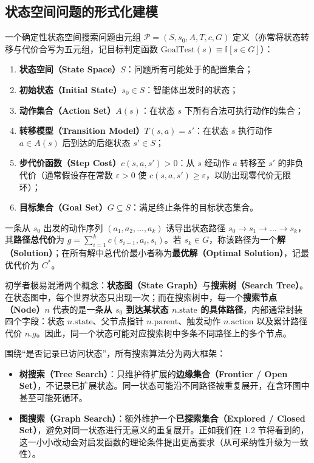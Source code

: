 \subsection{状态空间问题的形式化建模}

\begin{defBox}
\begin{definition}[确定性单智能体状态空间搜索问题]\label{def:search-problem}
一个确定性状态空间搜索问题由元组 $\mathcal{P} = (S, s_0, A, T, c, G)$ 定义（亦常将状态转移与代价合写为五元组，记目标判定函数 $\text{GoalTest}(s) \equiv \mathbb{I}[s \in G]$）：
\begin{enumerate}
  \item \textbf{状态空间（State Space）}$S$：问题所有可能处于的配置集合；
  \item \textbf{初始状态（Initial State）}$s_0 \in S$：智能体出发时的状态；
  \item \textbf{动作集合（Action Set）}$A(s)$：在状态 $s$ 下所有合法可执行动作的集合；
  \item \textbf{转移模型（Transition Model）}$T(s, a) = s'$：在状态 $s$ 执行动作 $a \in A(s)$ 后到达的后继状态 $s' \in S$；
  \item \textbf{步代价函数（Step Cost）}$c(s, a, s') > 0$：从 $s$ 经动作 $a$ 转移至 $s'$ 的非负代价（通常假设存在常数 $\varepsilon > 0$ 使 $c(s,a,s')\ge \varepsilon$，以防出现零代价无限环）；
  \item \textbf{目标集合（Goal Set）}$G \subseteq S$：满足终止条件的目标状态集合。
\end{enumerate}
一条从 $s_0$ 出发的动作序列 $(a_1, a_2, \dots, a_k)$ 诱导出状态路径 $s_0 \to s_1 \to \dots \to s_k$，其\textbf{路径总代价}为 $g = \sum_{i=1}^{k} c(s_{i-1}, a_i, s_i)$。若 $s_k \in G$，称该路径为一个\textbf{解（Solution）}；在所有解中总代价最小者称为\textbf{最优解（Optimal Solution）}，记最优代价为 $C^*$。
\end{definition}
\end{defBox}

初学者极易混淆两个概念：\textbf{状态图（State Graph）}与\textbf{搜索树（Search Tree）}。在状态图中，每个世界状态只出现一次；而在搜索树中，每一个\textbf{搜索节点（Node）}$n$ 代表的是一条\textbf{从 $s_0$ 到达某状态 $n.\text{state}$ 的具体路径}，内部通常封装四个字段：状态 $n.\text{state}$、父节点指针 $n.\text{parent}$、触发动作 $n.\text{action}$ 以及累计路径代价 $n.g$。因此，同一个状态可能对应搜索树中多条不同路径上的多个节点。

围绕“是否记录已访问状态”，所有搜索算法分为两大框架：
\begin{itemize}
  \item \textbf{树搜索（Tree Search）}：只维护待扩展的\textbf{边缘集合（Frontier / Open Set）}，不记录已扩展状态。同一状态可能沿不同路径被重复展开，在含环图中甚至可能死循环。
  \item \textbf{图搜索（Graph Search）}：额外维护一个\textbf{已探索集合（Explored / Closed Set）}，避免对同一状态进行无意义的重复展开。正如我们在 1.2 节将看到的，这一小小改动会对启发函数的理论条件提出更高要求（从可采纳性升级为一致性）。
\end{itemize}

